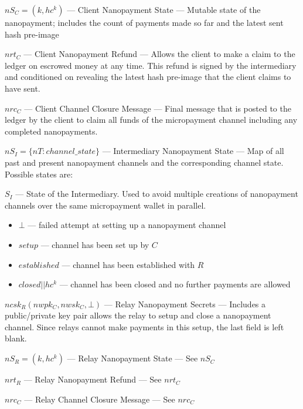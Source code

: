 $nS_C = (k, hc^k)$ --- Client Nanopayment State --- Mutable state of the
nanopayment; includes the count of payments made so far and the latest sent hash
pre-image

$nrt_C$ --- Client Nanopayment Refund --- Allows the client to make a claim
to the ledger on escrowed money at any time. This refund is signed by the
intermediary and conditioned on revealing the latest hash pre-image that the
client claims to have sent.

$nrc_C$ --- Client Channel Closure Message --- Final message that is
posted to the ledger by the client to claim all funds of the
micropayment channel including any completed nanopayments.

$nS_I = \{nT: channel\_state\}$ --- Intermediary Nanopayment State --- Map of
all past and present nanopayment channels and the corresponding channel
state. Possible states are:

$S_I$ --- State of the Intermediary. Used to avoid multiple creations of nanopayment channels over the same micropayment wallet in parallel.

\begin{itemize}
\item $\bot$ --- failed attempt at setting up a nanopayment channel
\item $setup$ --- channel has been set up by $C$
\item $established$ --- channel has been established with $R$
\item $closed||hc^k$ --- channel has been closed and no further payments
  are allowed
\end{itemize}

$ncsk_R (nwpk_C, nwsk_C, \bot)$ --- Relay Nanopayment Secrets --- Includes a
public/private key pair allows the relay to setup and close a nanopayment
channel. Since relays cannot make payments in this setup, the last field is left
blank.

$nS_R = (k, hc^k)$ --- Relay Nanopayment State --- See $nS_C$

$nrt_R$ --- Relay Nanopayment Refund --- See $nrt_C$

$nrc_C$ --- Relay Channel Closure Message --- See $nrc_C$

